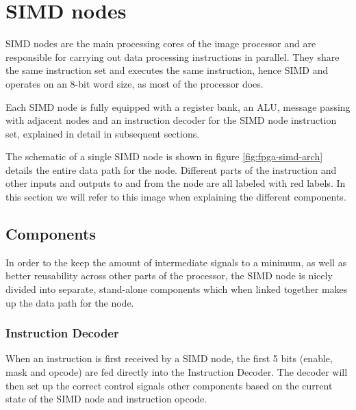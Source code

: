 \section{SIMD nodes}

\ac{SIMD} nodes are the main processing cores of the image processor and are
responsible for carrying out data processing instructions in parallel. They
share the same instruction set and executes the same instruction, hence
\acf{SIMD} and operates on an 8-bit word size, as most of the processor does.

Each \ac{SIMD} node is fully equipped with a register bank, an \ac{ALU}, message
passing with adjacent nodes and an instruction decoder for the \ac{SIMD} node
instruction set, explained in detail in subsequent sections.

The schematic of a single \ac{SIMD} node is shown in figure
\ref{fig:fpga-simd-arch} details the entire data path for the node. Different
parts of the instruction and other inputs and outputs to and from the node are
all labeled with red labels. In this section we will refer to this image when
explaining the different components.




\subsection{Components}


In order to the keep the amount of intermediate signals to a minimum, as well
as better reusability across other parts of the processor, the \ac{SIMD} node
is nicely divided into separate, stand-alone components which when linked
together makes up the data path for the node.

\subsubsection{Instruction Decoder}


When an instruction is first received by a \ac{SIMD} node, the first 5 bits
(enable, mask and opcode) are fed directly into the Instruction Decoder. The
decoder will then set up the correct control signals other components based on
the current state of the \ac{SIMD} node and instruction opcode.


